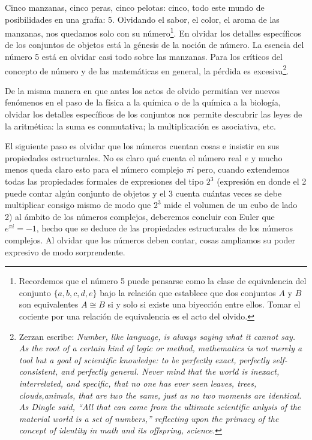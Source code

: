 \documentclass[12pt,a4paper, spanish]{amsart}
\numberwithin{equation}{section}
\theoremstyle{plain}
\theoremstyle{definition}
\begin{document}
Cinco manzanas, cinco peras, cinco pelotas: cinco, todo este mundo de posibilidades en una grafía: 5. Olvidando el sabor, el color, el aroma de las manzanas, nos quedamos solo con su número\footnote{Recordemos que el número 5 puede pensarse como la clase de equivalencia del conjunto $\{a,b,c,d,e\}$ bajo la relación  que establece que dos conjuntos $A$ y $B$ son equivalentes $A \cong B$  si y solo si existe una biyección entre ellos. Tomar el cociente por una relación de equivalencia es el acto del olvido.}. En olvidar los detalles específicos de los conjuntos de objetos está la génesis de la noción de número. La esencia del número 5 está en olvidar casi todo sobre las manzanas. Para los críticos del concepto de número y de las matemáticas en general, la pérdida es excesiva\footnote{Zerzan escribe: \emph{Number, like language, is always saying what it cannot say.  As the root of a certain kind of logic or method, mathematics is not merely a tool but a goal of scientific knowledge:  to be perfectly exact, perfectly self-consistent, and perfectly general.   Never mind that the world is inexact, interrelated, and specific, that no one has ever seen leaves, trees, clouds,animals, that are two the same, just as no two moments are identical.  As Dingle said, ``All that can come from the ultimate scientific anlysis of the material world is a set of numbers,'' reflecting upon the primacy of the concept of identity in math and its offspring, science.}\autocite{zerzan2009number}}.

De la misma manera en que antes los actos de olvido permitían ver nuevos fenómenos en el paso de la física a la química o de la química a la biología, olvidar los detalles específicos de los conjuntos nos permite descubrir las leyes de la aritmética: la suma es conmutativa; la multiplicación es asociativa, etc. 

El siguiente paso es olvidar que los números cuentan cosas e insistir en sus propiedades estructurales. No es claro qué cuenta el número real $e$ y mucho menos queda claro esto para el número complejo $\pi i$ pero, cuando extendemos todas las propiedades formales de expresiones del tipo $2^3$ (expresión en donde el 2 puede contar algún conjunto de objetos y el 3 cuenta cuántas veces se debe multiplicar consigo mismo de modo que $2^3$ mide el volumen de un cubo de lado 2) al ámbito de los números complejos, deberemos concluir con Euler\autocite{euler2012introduction} que $e^{\pi i} = -1$, hecho que se deduce de las propiedades estructurales de los números complejos. Al olvidar que los números deben contar, cosas ampliamos su poder expresivo de modo sorprendente. 
	
\end{document}
